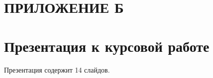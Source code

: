 \section*{\centering ПРИЛОЖЕНИЕ Б}

\section*{Презентация к курсовой работе}
Презентация содержит 14 слайдов.